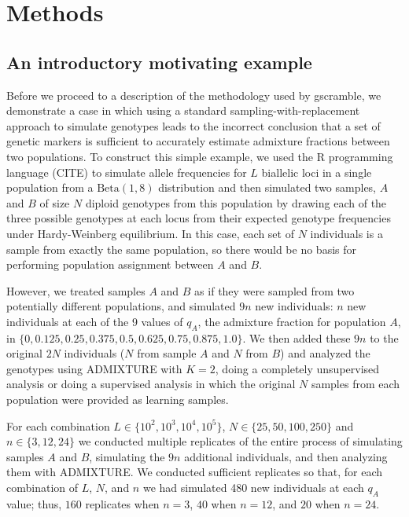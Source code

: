 \section*{Methods}

\subsection*{An introductory motivating example}

Before we proceed to a description of the methodology used by gscramble,
we demonstrate a case in which using a standard sampling-with-replacement
approach to simulate genotypes leads to the incorrect conclusion that a set of genetic
markers is sufficient to accurately estimate admixture fractions between two populations.
To construct this simple example, we used the R programming language (CITE) to
simulate allele frequencies for $L$ biallelic
loci in a single population from a $\mathrm{Beta}(1, 8)$ distribution and then simulated
two samples, $A$ and $B$ of size $N$ diploid genotypes from this population by drawing each of the three
possible genotypes at each locus from their
expected genotype frequencies under Hardy-Weinberg equilibrium.  In this case,
each set of $N$ individuals is a sample from exactly the same population, so
there would be no basis for performing population assignment between $A$ and $B$.

However, we treated samples $A$ and $B$ as if they were sampled from two potentially different
populations, and simulated $9n$ new individuals: $n$ new individuals at each of the 9 values of
$q_A$, the admixture fraction for population $A$, in  $\{0, 0.125, 0.25, 0.375, 0.5, 0.625, 0.75, 0.875, 1.0\}$.
We then added these $9n$ to the original $2N$ individuals ($N$ from sample $A$ and $N$ from $B$)
and analyzed the genotypes using ADMIXTURE with $K=2$, doing a completely
unsupervised analysis or doing a supervised analysis in which the original $N$ samples from each
population were provided as learning samples.

For each combination $L \in \{10^2, 10^3, 10^4, 10^5\}$,
$N \in \{25, 50, 100, 250\}$ and $n\in\{3,12,24\}$ we conducted multiple replicates
of the entire process of
simulating samples $A$ and $B$, simulating the $9n$ additional individuals, and
then analyzing them with ADMIXTURE.  We conducted sufficient replicates so that,
for each combination of $L$, $N$, and $n$ we had simulated 480 new individuals
at each $q_A$ value; thus, $160$ replicates when $n = 3$, $40$ when $n=12$, and
$20$ when $n=24$.

